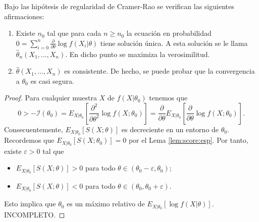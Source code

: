 \documentclass{article}
\begin{document}
    \begin{thm}
        Bajo las hipótesis de regularidad de Cramer-Rao se verifican las siguientes afirmaciones:
        \begin{enumerate}
            \item Existe $n_0$ tal que para cada $n \ge n_0$ la ecuación en probabilidad $0 =\sum_{i=0}^n \frac{\partial}{\partial \theta} \log f(X_i | \theta)$ tiene solución única. A esta solución se le llama $\hat{\theta}_n(X_1, \ldots, X_n)$. En dicho punto se maximiza la verosimilitud.
            \item $\hat{\theta}(X_1, \ldots, X_n)$ es consistente. De hecho, se puede probar que la convergencia a $\theta_0$ es casi segura.
        \end{enumerate}
    \end{thm}
    \begin{proof}
        Para cualquier muestra $X$ de $f(X|\theta_0)$ tenemos que
        \[0 > -\mathcal{I}(\theta_0)=E_{X|\theta_0}\left[ \frac{\partial^2}{\partial\theta^2} \log f(X;\theta_0)\right] = \frac{\partial}{\partial\theta} E_{X|\theta_0} \left[ \frac{\partial}{\partial\theta} \log f(X;\theta_0) \right].\]
        Consecuentemente, $E_{X|\theta_0} \left[ S(X; \theta) \right]$ es decreciente en un entorno de $\theta_0$. Recordemos que $E_{X|\theta_0} \left[ S(X; \theta_0) \right] = 0$ por el Lema \ref{lem:score:esp}. Por tanto, existe $\varepsilon > 0$ tal que
        \begin{itemize}
            \item $E_{X|\theta_0} \left[ S(X; \theta) \right] > 0$ para todo $\theta \in (\theta_0 - \varepsilon, \theta_0)$;
            \item $E_{X|\theta_0} \left[ S(X; \theta) \right] < 0$ para todo $\theta \in (\theta_0, \theta_0 + \varepsilon)$.
        \end{itemize}
        Esto implica que $\theta_0$ es un máximo relativo de $E_{X|\theta_0}[\log f(X|\theta)]$.
        INCOMPLETO.
    \end{proof}
\end{document}
